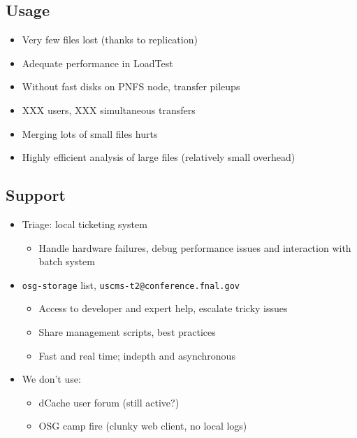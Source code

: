 \documentclass{beamer}
\begin{document}
\subsection{Usage}
\begin{frame}
\begin{itemize}
	\item Very few files lost (thanks to replication)
	\item Adequate performance in LoadTest
	\item Without fast disks on PNFS node, transfer pileups
	\item XXX users, XXX simultaneous transfers
	\item Merging lots of small files hurts
	\item Highly efficient analysis of large files (relatively small overhead)
\end{itemize}
\end{frame}

\subsection{Support}
\begin{frame}
\begin{itemize}
	\item Triage: local ticketing system
	\begin{itemize}
		\item Handle hardware failures, debug performance issues and interaction with batch system
	\end{itemize}
	\item {\tt osg-storage} list, {\tt uscms-t2@conference.fnal.gov}
	\begin{itemize}
		\item Access to developer and expert help, escalate tricky issues
		\item Share management scripts, best practices
		\item Fast and real time; indepth and asynchronous
	\end{itemize}
	\item We don't use:
	\begin{itemize}
		\item dCache user forum (still active?)
		\item OSG camp fire (clunky web client, no local logs)
	\end{itemize}
\end{itemize}
\end{frame}
\end{document}
